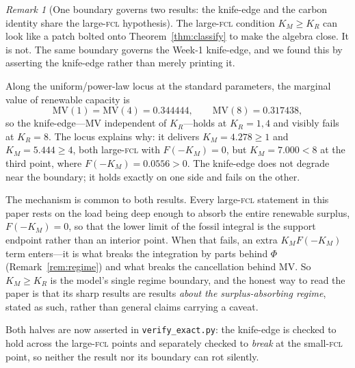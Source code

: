\documentclass[11pt,reqno]{amsart}
\theoremstyle{plain}
\theoremstyle{definition}
\theoremstyle{remark}
\newtheorem{remark}{Remark}
\theoremstyle{remark}\newtheorem{observation}{Observation}
\newcommand{\KR}{K_R}\newcommand{\KF}{K_F}\newcommand{\KM}{K_M}
\begin{document}
\begin{remark}[One boundary governs two results: the knife-edge and the carbon identity
share the large-\textsc{fcl} hypothesis]
\label{rem:oneboundary}
The large-\textsc{fcl} condition $\KM\ge\KR$ can look like a patch bolted onto
Theorem~\ref{thm:classify} to make the algebra close. It is not. The same boundary governs
the Week-1 knife-edge, and we found this by asserting the knife-edge rather than merely
printing it.

Along the uniform/power-law locus at the standard parameters, the marginal value of
renewable capacity is
\[
  \mathrm{MV}(1)=\mathrm{MV}(4)=0.344444,\qquad \mathrm{MV}(8)=0.317438,
\]
so the knife-edge---$\mathrm{MV}$ independent of $\KR$---holds at $\KR=1,4$ and visibly
fails at $\KR=8$. The locus explains why: it delivers $\KM=4.278\ge1$ and $\KM=5.444\ge4$,
both large-\textsc{fcl} with $F(-\KM)=0$, but $\KM=7.000<8$ at the third point, where
$F(-\KM)=0.0556>0$. The knife-edge does not degrade near the boundary; it holds exactly on
one side and fails on the other.

The mechanism is common to both results. Every large-\textsc{fcl} statement in this paper
rests on the load being deep enough to absorb the entire renewable surplus, $F(-\KM)=0$, so
that the lower limit of the fossil integral is the support endpoint rather than an interior
point. When that fails, an extra $\KM F(-\KM)$ term enters---it is what breaks the
integration by parts behind $\Phi$ (Remark~\ref{rem:regime}) and what breaks the
cancellation behind $\mathrm{MV}$. So $\KM\ge\KR$ is the model's single regime boundary, and
the honest way to read the paper is that its sharp results are results \emph{about the
surplus-absorbing regime}, stated as such, rather than general claims carrying a caveat.

Both halves are now asserted in \texttt{verify\_exact.py}: the knife-edge is checked to hold
across the large-\textsc{fcl} points and separately checked to \emph{break} at the
small-\textsc{fcl} point, so neither the result nor its boundary can rot silently.
\end{remark}
\end{document}
